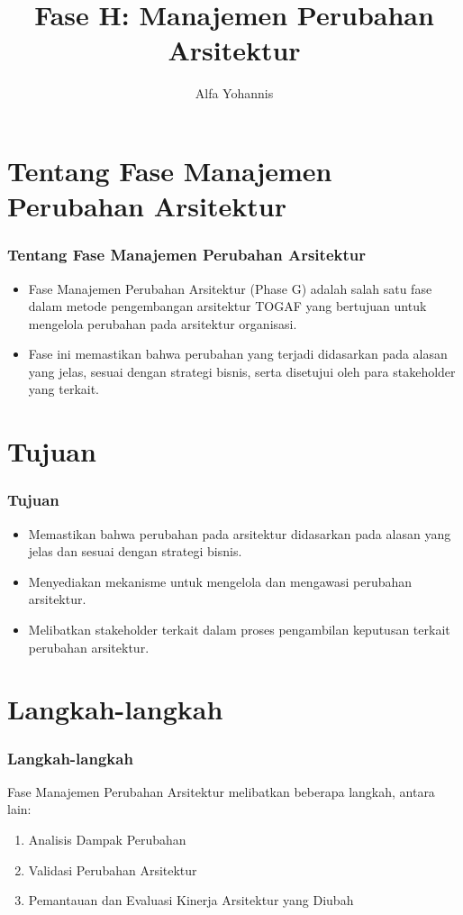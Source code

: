 \documentclass{beamer}
\author{Alfa Yohannis}
\begin{document}
	
	\begin{frame}
		\title{Fase H: Manajemen Perubahan Arsitektur}
		\author{}
		\date{}
		\titlepage
	\end{frame}
	
	\section{Tentang Fase Manajemen Perubahan Arsitektur}
	\begin{frame}
		\frametitle{Tentang Fase Manajemen Perubahan Arsitektur}
		\begin{itemize}
		\item Fase Manajemen Perubahan Arsitektur (Phase G) adalah salah satu fase dalam metode pengembangan arsitektur TOGAF yang bertujuan untuk mengelola perubahan pada arsitektur organisasi. 
		\item Fase ini memastikan bahwa perubahan yang terjadi didasarkan pada alasan yang jelas, sesuai dengan strategi bisnis, serta disetujui oleh para stakeholder yang terkait.
		\end{itemize}
	\end{frame}
	
	\section{Tujuan}
	\begin{frame}
		\frametitle{Tujuan}
		\begin{itemize}
			\item Memastikan bahwa perubahan pada arsitektur didasarkan pada alasan yang jelas dan sesuai dengan strategi bisnis.
			\item Menyediakan mekanisme untuk mengelola dan mengawasi perubahan arsitektur.
			\item Melibatkan stakeholder terkait dalam proses pengambilan keputusan terkait perubahan arsitektur.
		\end{itemize}
	\end{frame}
	
	\section{Langkah-langkah}
	\begin{frame}
		\frametitle{Langkah-langkah}
		Fase Manajemen Perubahan Arsitektur melibatkan beberapa langkah, antara lain:
		\begin{enumerate}
			\item Analisis Dampak Perubahan
			\item Validasi Perubahan Arsitektur
			\item Pemantauan dan Evaluasi Kinerja Arsitektur yang Diubah
		\end{enumerate}
	\end{frame}
	
\end{document}
